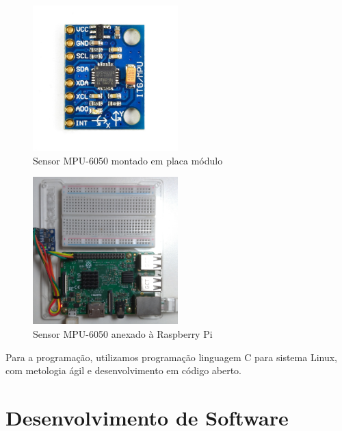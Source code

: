 \begin{figure}[H]
    \centering
    \caption{Sensor MPU-6050 montado em placa módulo}\label{fig:mpu6050-board-top}
    \includegraphics[width=0.5\textwidth]{figuras/mpu6050-board-top.jpg}
\end{figure}
\begin{figure}[H]
    \centering
    \caption{Sensor MPU-6050 anexado à Raspberry Pi}\label{fig:mpu6050-proto-top}
    \includegraphics[width=0.5\textwidth]{figuras/mpu6050-proto-top.jpg}
\end{figure}

Para a programação, utilizamos programação linguagem C para sistema Linux, com metologia ágil e desenvolvimento em código aberto.

\section{Desenvolvimento de Software}

